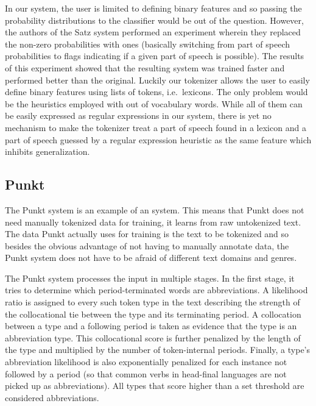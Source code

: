 In our system, the user is limited to defining binary features and so passing
the probability distributions to the classifier would be out of the question.
However, the authors of the Satz system performed an experiment wherein they
replaced the non-zero probabilities with ones (basically switching from part of
speech probabilities to flags indicating if a given part of speech is
possible). The results of this experiment showed that the resulting system was
trained faster and performed better than the original. Luckily our tokenizer
allows the user to easily define binary features using lists of tokens, i.e.\
lexicons. The only problem would be the heuristics employed with out of
vocabulary words. While all of them can be easily expressed as regular
expressions in our system, there is yet no mechanism to make the tokenizer
treat a part of speech found in a lexicon and a part of speech guessed by a
regular expression heuristic as the same feature which inhibits generalization.

\subsection{Punkt}
\label{sec:survey-punkt}

The Punkt system \cite{sbd-punkt} is an example of an \newterm{unsupervised
machine-learning} system. This means that Punkt does not need manually
tokenized data for training, it learns from raw untokenized text. The data
Punkt actually uses for training is the text to be tokenized and so besides the
obvious advantage of not having to manually annotate data, the Punkt system
does not have to be afraid of different text domains and genres.

The Punkt system processes the input in multiple stages. In the first stage, it
tries to determine which period-terminated words are abbreviations. A
likelihood ratio is assigned to every such token type in the text describing
the strength of the collocational tie between the type and its
terminating period. A collocation between a type and a following period is
taken as evidence that the type is an abbreviation type. This collocational
score is further penalized by the length of the type and multiplied by the
number of token-internal periods. Finally, a type's abbreviation likelihood is
also exponentially penalized for each instance not followed by a period (so
that common verbs in head-final languages are not picked up as abbreviations).
All types that score higher than a set threshold are considered abbreviations.

